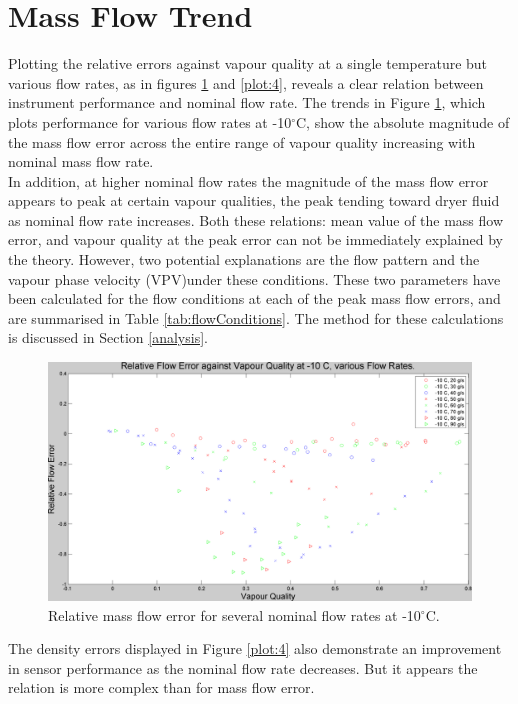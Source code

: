 \documentclass{report}
\begin{document}
\section{Mass Flow Trend}
\FloatBarrier
Plotting the relative errors against vapour quality at a single temperature but various flow rates, as in figures \ref{plot:3} and \ref{plot:4}, reveals a clear relation between instrument performance and nominal flow rate. The trends in Figure \ref{plot:3}, which plots performance for various flow rates at -10$^\circ$C, show the absolute magnitude of the mass flow error across the entire range of vapour quality increasing with nominal mass flow rate. \\
In addition, at higher nominal flow rates the magnitude of the mass flow error appears to peak at certain vapour qualities, the peak tending toward dryer fluid as nominal flow rate increases. Both these relations: mean value of the mass flow error, and vapour quality at the peak error can not be immediately explained by the theory. However, two potential explanations are the flow pattern and the vapour phase velocity (VPV)under these conditions. These two parameters have been calculated for the flow conditions at each of the peak mass flow errors, and are summarised in Table \ref{tab:flowConditions}. The method for these calculations is discussed in Section \ref{analysis}.\\ 
\begin{figure}
\includegraphics[width=\textwidth]{plots/fig3}
\caption{Relative mass flow error for several nominal flow rates at -10$^\circ$C.}
\label{plot:3}
\end{figure}
The density errors displayed in Figure \ref{plot:4} also demonstrate an improvement in sensor performance as the nominal flow rate decreases. But it appears the relation is more complex than for mass flow error.
\end{document}
